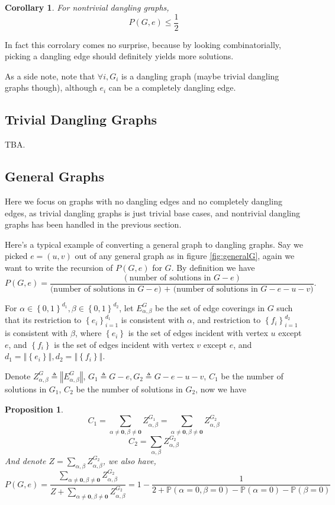 \documentclass[a4paper]{article}
\newtheorem{Cor}[Thm]{Corollary}
\newtheorem{Prop}[Thm]{Proposition}
\newcommand{\norm}[1]{\left\Vert#1\right\Vert}
\newcommand{\set}[1]{\left\{#1\right\}}
\begin{document}
\begin{Cor}
	For nontrivial dangling graphs,
	\[P(G, e) \leq \frac{1}{2}\]
\end{Cor}

In fact this corrolary comes no surprise, because by looking combinatorially, picking a dangling edge should definitely yields more solutions.

As a side note, note that $\forall i, G_i$ is a dangling graph (maybe trivial dangling graphs though), although $e_i$ can be a completely dangling edge.


\subsection{Trivial Dangling Graphs}
TBA.

\subsection{General Graphs}
Here we focus on graphs with no dangling edges and no completely dangling edges, as trivial dangling graphs is just trivial base cases, and nontrivial dangling graphs has been handled in the previous section.

Here's a typical example of converting a general graph to dangling graphs.
Say we picked $e=(u,v)$ out of any general graph as in figure \ref{fig:generalG}, again we want to write the recursion of $P(G,e)$ for $G$.
By definition we have 
\begin{equation}
	P(G,e) = \frac{(\textrm{number of solutions in $G-e$})}{\textrm{(number of solutions in $G-e$) + (number of solutions in $G-e-u-v$)}}.
\end{equation}


	For $\alpha \in \set{0,1}^{d_1}, \beta \in \set{0,1}^{d_2}$, let $E_{\alpha,\beta}^G$ be the set of edge coverings in $G$ such that its restriction to $\set{e_i}_{i=1}^{d_1}$ is consistent with $\alpha$, and restriction to $\set{f_i}_{i=1}^{d_2}$ is consistent with $\beta$,  where $\set{e_i}$ is the set of edges incident with vertex $u$ except $e$, and $\set{f_i}$ is the set of edges incident with vertex $v$ except $e$, and $d_1 = \norm{\set{e_i}}, d_2 = \norm{\set{f_i}}$.

	Denote $Z_{\alpha, \beta}^G \triangleq \norm{E_{\alpha, \beta}^G}$, $G_1 \triangleq G-e, G_2 \triangleq G-e-u-v$, $C_1$ be the number of solutions in $G_1$, $C_2$ be the number of solutions in $G_2$, now we have
\begin{Prop}
\[C_1 = \sum_{\alpha \neq \mathbf{0}, \beta \neq \mathbf{0}} Z_{\alpha, \beta}^{G_1} = \sum_{\alpha \neq \mathbf{0}, \beta \neq \mathbf{0}} Z_{\alpha, \beta}^{G_2}\]
\[C_2 = \sum_{\alpha , \beta} Z_{\alpha, \beta}^{G_2}\]
And denote $Z = \sum_{\alpha , \beta} Z_{\alpha, \beta}^{G_2}$, we also have,
\[P(G,e) = \frac{\sum_{\alpha \neq \mathbf{0}, \beta \neq \mathbf{0}} Z_{\alpha, \beta}^{G_2}}{Z + \sum_{\alpha \neq \mathbf{0}, \beta \neq \mathbf{0}} Z_{\alpha, \beta}^{G_2}} = 1 - \frac{1}{2 + \mathbb{P}\left( \alpha = 0, \beta = 0 \right) - \mathbb{P} \left( \alpha = 0 \right) - \mathbb{P} \left( \beta = 0 \right)}\]
\end{Prop}
\end{document}
